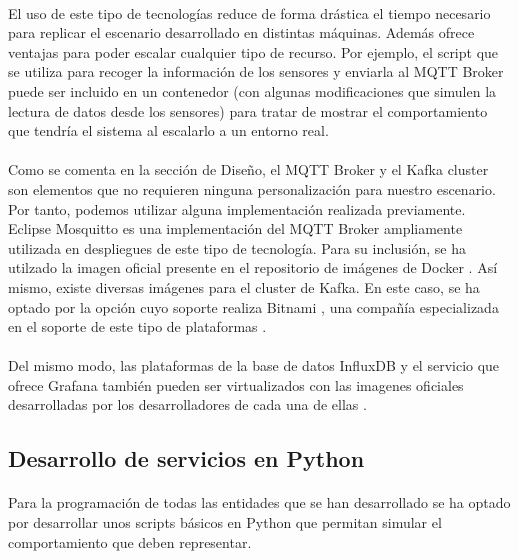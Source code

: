 \documentclass[12pt, a4paper]{article}
\begin{document}
        \paragraph{}
        El uso de este tipo de tecnologías reduce de forma drástica el tiempo necesario para replicar el escenario desarrollado en distintas máquinas. Además ofrece ventajas para poder escalar cualquier tipo de recurso. Por ejemplo, el script que se utiliza para recoger la información de los sensores y enviarla al MQTT Broker puede ser incluido en un contenedor (con algunas modificaciones que simulen la lectura de datos desde los sensores) para tratar de mostrar el comportamiento que tendría el sistema al escalarlo a un entorno real.

        \paragraph{}
        Como se comenta en la sección de Diseño, el MQTT Broker y el Kafka cluster son elementos que no requieren ninguna personalización para nuestro escenario. Por tanto, podemos utilizar alguna implementación realizada previamente. Eclipse Mosquitto \cite{mosquitto} es una implementación del MQTT Broker ampliamente utilizada en despliegues de este tipo de tecnología. Para su inclusión, se ha utilzado la imagen oficial presente en el repositorio de imágenes de Docker \cite{mosquitto-docker}. Así mismo, existe diversas imágenes para el cluster de Kafka. En este caso, se ha optado por la opción cuyo soporte realiza Bitnami \cite{bitnami}, una compañía especializada en el soporte de este tipo de plataformas \cite{kafka-docker}.

        \paragraph{}
        Del mismo modo, las plataformas de la base de datos InfluxDB y el servicio que ofrece Grafana también pueden ser virtualizados con las imagenes oficiales desarrolladas por los desarrolladores de cada una de ellas \cite{influx-docker} \cite{grafana-docker}.

        \subsection{Desarrollo de servicios en Python}

        \paragraph{}
        Para la programación de todas las entidades que se han desarrollado se ha optado por desarrollar unos scripts básicos en Python que permitan simular el comportamiento que deben representar.
\end{document}
